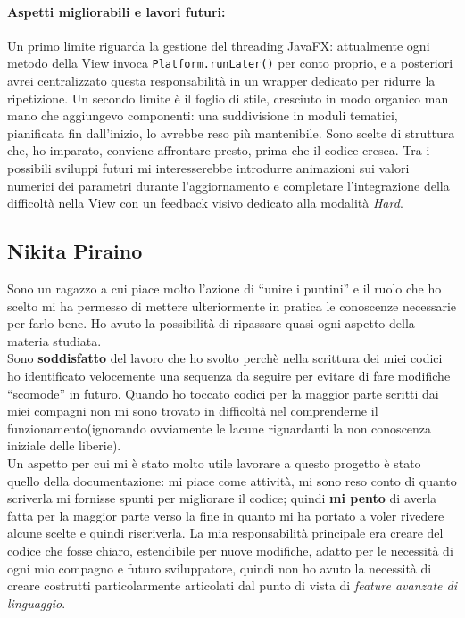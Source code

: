 \documentclass[11pt, a4paper, oneside]{report}
\begin{document}
\paragraph{Aspetti migliorabili e lavori futuri:}
Un primo limite riguarda la gestione del threading JavaFX: attualmente ogni
metodo della View invoca \texttt{Platform.runLater()} per conto proprio, e a
posteriori avrei centralizzato questa responsabilità in un wrapper dedicato per
ridurre la ripetizione. Un secondo limite è il foglio di stile, cresciuto in
modo organico man mano che aggiungevo componenti: una suddivisione in moduli
tematici, pianificata fin dall'inizio, lo avrebbe reso più mantenibile. Sono
scelte di struttura che, ho imparato, conviene affrontare presto, prima che il
codice cresca. Tra i possibili sviluppi futuri mi interesserebbe introdurre
animazioni sui valori numerici dei parametri durante l'aggiornamento e
completare l'integrazione della difficoltà nella View con un feedback visivo
dedicato alla modalità \emph{Hard}.

\subsection{Nikita Piraino}
Sono un ragazzo a cui piace molto l'azione di ``unire i puntini'' e il ruolo che ho scelto mi ha permesso di mettere ulteriormente in pratica le conoscenze necessarie per farlo bene. Ho avuto la possibilità di ripassare quasi ogni aspetto della materia studiata. \\

Sono \textbf{soddisfatto} del lavoro che ho svolto perchè nella scrittura dei miei codici ho identificato velocemente una sequenza da seguire per evitare di  fare  modifiche ``scomode'' in futuro. Quando ho toccato  codici per la maggior parte scritti dai miei compagni non mi sono trovato in difficoltà nel comprenderne il funzionamento(ignorando ovviamente le lacune riguardanti la non conoscenza iniziale delle liberie). \\
Un aspetto per cui mi è stato molto utile lavorare a questo progetto è stato quello della documentazione: mi piace come attività, mi sono reso conto di quanto scriverla mi fornisse spunti per migliorare il codice; quindi \textbf{mi pento} di averla fatta per la maggior parte  verso la fine in quanto mi ha portato a voler rivedere alcune scelte e quindi riscriverla. La mia responsabilità principale era creare del codice che fosse chiaro, estendibile per nuove modifiche, adatto per le necessità di ogni mio compagno e futuro sviluppatore, quindi non ho avuto la necessità di creare costrutti particolarmente articolati dal punto di vista di \textit{feature avanzate di linguaggio}.\\
\end{document}
